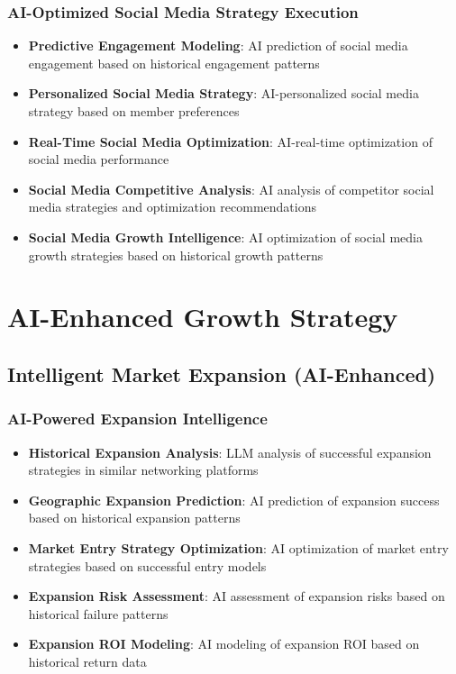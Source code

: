 \subsubsection{AI-Optimized Social Media Strategy Execution}

\begin{itemize}
    \item \textbf{Predictive Engagement Modeling}: AI prediction of social media engagement based on historical engagement patterns
    \item \textbf{Personalized Social Media Strategy}: AI-personalized social media strategy based on member preferences
    \item \textbf{Real-Time Social Media Optimization}: AI-real-time optimization of social media performance
    \item \textbf{Social Media Competitive Analysis}: AI analysis of competitor social media strategies and optimization recommendations
    \item \textbf{Social Media Growth Intelligence}: AI optimization of social media growth strategies based on historical growth patterns
\end{itemize}

\section{AI-Enhanced Growth Strategy}

\subsection{Intelligent Market Expansion (AI-Enhanced)}

\subsubsection{AI-Powered Expansion Intelligence}

\begin{itemize}
    \item \textbf{Historical Expansion Analysis}: LLM analysis of successful expansion strategies in similar networking platforms
    \item \textbf{Geographic Expansion Prediction}: AI prediction of expansion success based on historical expansion patterns
    \item \textbf{Market Entry Strategy Optimization}: AI optimization of market entry strategies based on successful entry models
    \item \textbf{Expansion Risk Assessment}: AI assessment of expansion risks based on historical failure patterns
    \item \textbf{Expansion ROI Modeling}: AI modeling of expansion ROI based on historical return data
\end{itemize}

